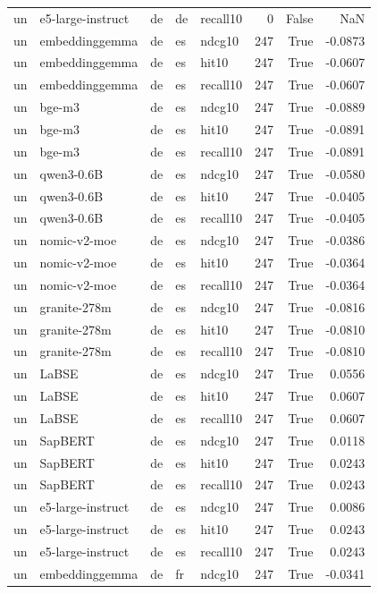 \begin{tabular}{lllllrrr}
un & e5-large-instruct & de & de & recall10 & 0 & False & NaN \\
un & embeddinggemma & de & es & ndcg10 & 247 & True & -0.0873 \\
un & embeddinggemma & de & es & hit10 & 247 & True & -0.0607 \\
un & embeddinggemma & de & es & recall10 & 247 & True & -0.0607 \\
un & bge-m3 & de & es & ndcg10 & 247 & True & -0.0889 \\
un & bge-m3 & de & es & hit10 & 247 & True & -0.0891 \\
un & bge-m3 & de & es & recall10 & 247 & True & -0.0891 \\
un & qwen3-0.6B & de & es & ndcg10 & 247 & True & -0.0580 \\
un & qwen3-0.6B & de & es & hit10 & 247 & True & -0.0405 \\
un & qwen3-0.6B & de & es & recall10 & 247 & True & -0.0405 \\
un & nomic-v2-moe & de & es & ndcg10 & 247 & True & -0.0386 \\
un & nomic-v2-moe & de & es & hit10 & 247 & True & -0.0364 \\
un & nomic-v2-moe & de & es & recall10 & 247 & True & -0.0364 \\
un & granite-278m & de & es & ndcg10 & 247 & True & -0.0816 \\
un & granite-278m & de & es & hit10 & 247 & True & -0.0810 \\
un & granite-278m & de & es & recall10 & 247 & True & -0.0810 \\
un & LaBSE & de & es & ndcg10 & 247 & True & 0.0556 \\
un & LaBSE & de & es & hit10 & 247 & True & 0.0607 \\
un & LaBSE & de & es & recall10 & 247 & True & 0.0607 \\
un & SapBERT & de & es & ndcg10 & 247 & True & 0.0118 \\
un & SapBERT & de & es & hit10 & 247 & True & 0.0243 \\
un & SapBERT & de & es & recall10 & 247 & True & 0.0243 \\
un & e5-large-instruct & de & es & ndcg10 & 247 & True & 0.0086 \\
un & e5-large-instruct & de & es & hit10 & 247 & True & 0.0243 \\
un & e5-large-instruct & de & es & recall10 & 247 & True & 0.0243 \\
un & embeddinggemma & de & fr & ndcg10 & 247 & True & -0.0341 \\

\end{tabular}
